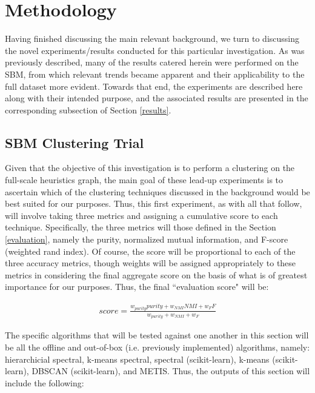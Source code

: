 \documentclass{article}
\begin{document}
\clearpage
\section{Methodology}\label{methodology}
Having finished discussing the main relevant background, we turn to discussing the novel experiments/results conducted for this particular investigation. As was previously described, many of the results catered herein were performed on the SBM, from which relevant trends became apparent and their applicability to the full dataset more evident. Towards that end, the experiments are described here along with their intended purpose, and the associated results are presented in the corresponding subsection of Section \ref{results}.

\subsection{SBM Clustering Trial}
Given that the objective of this investigation is to perform a clustering on the full-scale heuristics graph, the main goal of these lead-up experiments is to ascertain which of the clustering techniques discussed in the background would be best suited for our purposes. Thus, this first experiment, as with all that follow, will involve taking three metrics and assigning a cumulative score to each technique. Specifically, the three metrics will those defined in the Section \ref{evaluation}, namely the purity, normalized mutual information, and F-score (weighted rand index). Of course, the score will be proportional to each of the three accuracy metrics, though weights will be assigned appropriately to these metrics in considering the final aggregate score on the basis of what is of greatest importance for our purposes. Thus, the final ``evaluation score" will be:

\begin{align}
    score = \frac{w_{purity}purity + w_{NMI}NMI + w_{F}F}{w_{purity} + w_{NMI} + w_{F}}\label{eq:overall}
\end{align}

The specific algorithms that will be tested against one another in this section will be all the offline and out-of-box (i.e. previously implemented) algorithms, namely: hierarchicial spectral, k-means spectral, spectral (scikit-learn), k-means (scikit-learn), DBSCAN (scikit-learn), and METIS. Thus, the outputs of this section will include the following:
\end{document}
